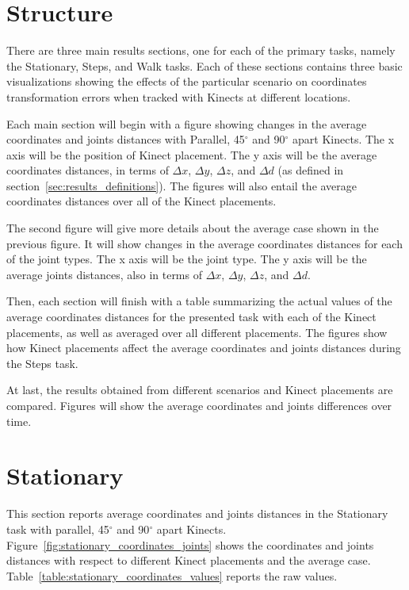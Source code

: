 \section{Structure}
\label{sec:results_structure}

There are three main results sections, one for each of the primary tasks, namely the Stationary, Steps, and Walk tasks. Each of these sections contains three basic visualizations showing the effects of the particular scenario on coordinates transformation errors when tracked with Kinects at different locations.

Each main section will begin with a figure showing changes in the average coordinates and joints distances with Parallel, 45$^{\circ}$ and 90$^{\circ}$ apart Kinects. The x axis will be the position of Kinect placement. The y axis will be the average coordinates distances, in terms of $\Delta x$, $\Delta y$, $\Delta z$, and $\Delta d$ (as defined in section~\ref{sec:results_definitions}). The figures will also entail the average coordinates distances over all of the Kinect placements.

The second figure will give more details about the average case shown in the previous figure. It will show changes in the average coordinates distances for each of the joint types. The x axis will be the joint type. The y axis will be the average joints distances, also in terms of $\Delta x$, $\Delta y$, $\Delta z$, and $\Delta d$.

Then, each section will finish with a table summarizing the actual values of the average coordinates distances for the presented task with each of the Kinect placements, as well as averaged over all different placements. The figures show how Kinect placements affect the average coordinates and joints distances during the Steps task.

At last, the results obtained from different scenarios and Kinect placements are compared. Figures will show the average coordinates and joints differences over time.

\section{Stationary}
\label{sec:results_stationary}

This section reports average coordinates and joints distances in the Stationary task with parallel, 45$^{\circ}$ and 90$^{\circ}$ apart Kinects. Figure~\ref{fig:stationary_coordinates_joints} shows the coordinates and joints distances with respect to different Kinect placements and the average case. Table~\ref{table:stationary_coordinates_values} reports the raw values.

